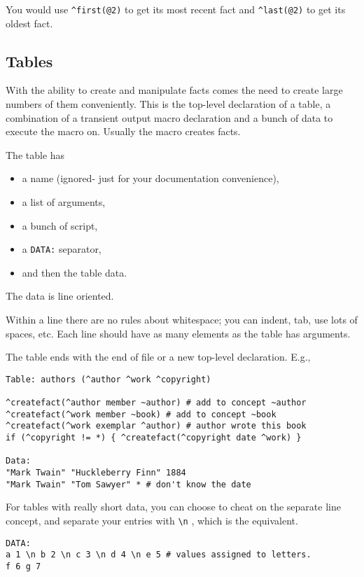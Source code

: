 \documentclass[]{article}
\providecommand{\tightlist}{%
  \setlength{\itemsep}{0pt}\setlength{\parskip}{0pt}}
\begin{document}
You would use \texttt{\^{}first(@2)} to get its most recent fact and
\texttt{\^{}last(@2)} to get its oldest fact.

\subsection{Tables}\label{tables}

With the ability to create and manipulate facts comes the need to create
large numbers of them conveniently. This is the top-level declaration of
a table, a combination of a transient output macro declaration and a
bunch of data to execute the macro on. Usually the macro creates facts.

The table has

\begin{itemize}
\tightlist
\item
  a name (ignored- just for your documentation convenience),
\item
  a list of arguments,
\item
  a bunch of script,
\item
  a \texttt{DATA:} separator,
\item
  and then the table data.
\end{itemize}

The data is line oriented.

Within a line there are no rules about whitespace; you can indent, tab,
use lots of spaces, etc. Each line should have as many elements as the
table has arguments.

The table ends with the end of file or a new top-level declaration.
E.g.,

\begin{verbatim}
Table: authors (^author ^work ^copyright)

^createfact(^author member ~author) # add to concept ~author
^createfact(^work member ~book) # add to concept ~book
^createfact(^work exemplar ^author) # author wrote this book
if (^copyright != *) { ^createfact(^copyright date ^work) }

Data:
"Mark Twain" "Huckleberry Finn" 1884
"Mark Twain" "Tom Sawyer" * # don't know the date
\end{verbatim}

For tables with really short data, you can choose to cheat on the
separate line concept, and separate your entries with
\texttt{\textbackslash{}n} , which is the equivalent.

\begin{verbatim}
DATA:
a 1 \n b 2 \n c 3 \n d 4 \n e 5 # values assigned to letters.
f 6 g 7
\end{verbatim}
\end{document}
